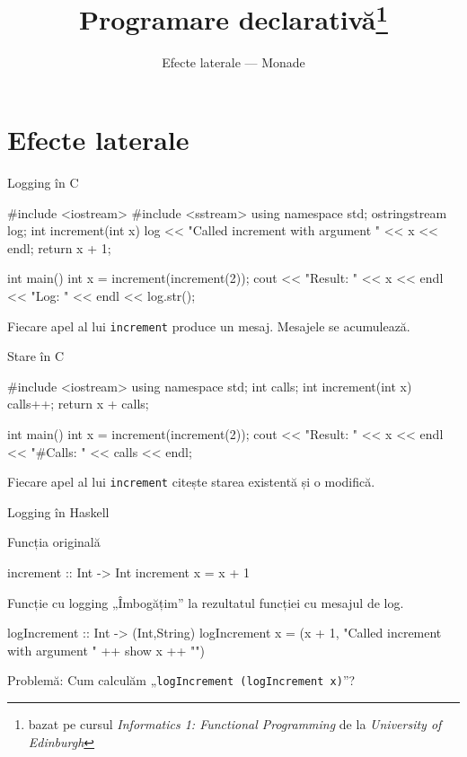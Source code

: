 \documentclass[xcolor=pdftex,romanian,colorlinks]{beamer}
\title[PD---Monade]{Programare declarativă\thanks{bazat pe cursul \emph{Informatics 1: Functional Programming} de la \emph{University of Edinburgh}}}
\subtitle{Efecte laterale --- Monade}
\begin{document}
\begin{frame}
  \titlepage
\end{frame}

\section{Efecte laterale}

\begin{frame}[fragile]{Logging în C}
\begin{asciic}
#include <iostream>
#include <sstream>
using namespace std;
ostringstream log;
int increment(int x) {
  log << "Called increment with argument " << x << endl;
  return x + 1;
}

int main() {
  int x = increment(increment(2));
  cout << "Result: " << x << endl << "Log: " << endl << log.str();
}
\end{asciic}

Fiecare apel al lui \lstinline$increment$ produce un mesaj. Mesajele se acumulează.
\end{frame}

\begin{frame}[fragile]{Stare în C}
\begin{asciic}
#include <iostream>
using namespace std;
int calls;
int increment(int x) {
  calls++;
  return x + calls;
}

int main() {
  int x = increment(increment(2));
  cout << "Result: " << x << endl << "#Calls: " << calls << endl;
}
\end{asciic}

Fiecare apel al lui \lstinline$increment$ citește starea existentă și o modifică.
\end{frame}

\begin{frame}[fragile]{Logging în Haskell}
\begin{block}{Funcția originală}
\vspace{-2ex}
\begin{asciihs}
increment :: Int -> Int
increment x = x + 1
\end{asciihs}
\end{block}
\begin{block}{Funcție cu logging}
„Îmbogățim” la rezultatul funcției cu mesajul de log.
\begin{asciihs}
logIncrement :: Int -> (Int,String)
logIncrement x = (x + 1, "Called increment with argument " ++ show x ++ "\n")
\end{asciihs}
\alert{Problemă:} Cum calculăm „\lstinline$logIncrement (logIncrement x)$”?
\end{block}
\end{frame}
\end{document}
